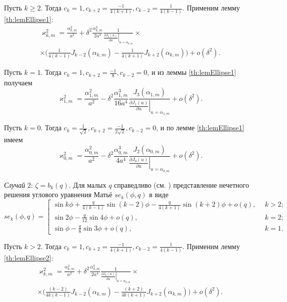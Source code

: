 Пусть $k \geq 2$. Тогда $c_k = 1, c_{k+2}=\frac{-1}{4(k+1)},  c_{k-2}=\frac{1}{4(k-1)}$. Применим лемму \ref{th:lemEllipse1}:
\begin{multline*}
\varkappa_{k, m}^2 = 
\frac{\alpha_{k, m}^2}{a^2} +  \delta^2 \frac{\alpha_{k, m}^3}{2 a^4}\frac{1}{\left.\frac{\partial J_{k} (u)}{\partial u}\right|_{u=\alpha_{k, m}}} \times \\ \times
\biggl(
\frac{1}{4(k-1)} J_{k-2}(\alpha_{k, m}) - \frac{1}{4(k+1)}J_{k+2}(\alpha_{k, m})
\biggr) + o(\delta^2).
\end{multline*}

Пусть $k =1$. Тогда $c_k = 1, c_{k+2}=\frac{-1}{8},  c_{k-2}=0$, и из леммы \ref{th:lemEllipse1} получаем
$$
\varkappa_{1, m}^2 = 
\frac{\alpha_{1, m}^2}{a^2} -  \delta^2 \frac{\alpha_{1, m}^3}{16 a^4}\frac{J_{3}(\alpha_{1, m})}{\left.\frac{\partial J_{1} (u)}{\partial u}\right|_{u=\alpha_{1, m}}}  + o(\delta^2).
$$

Пусть $k =0$. Тогда $c_k = \frac{1}{\sqrt{2}}, c_{k+2}=\frac{-1}{2\sqrt{2}},  c_{k-2}=0$, и по лемме \ref{th:lemEllipse1} имеем
$$
\varkappa_{0, m}^2 = 
\frac{\alpha_{0, m}^2}{a^2} -  \delta^2 \frac{\alpha_{0, m}^3}{4 a^4}\frac{J_{2}(\alpha_{0, m})}{\left.\frac{\partial J_{0} (u)}{\partial u}\right|_{u=\alpha_{0, m}}} 
 + o(\delta^2).
$$

\textit{Случай} 2: $\zeta = b_k(q)$.
Для малых $q$ справедливо (см. \cite{wref2}) представление нечетного решения углового уравнения Матьё $se_k(\phi, q)$ в виде 
{
\[
se_k(\phi, q) = 
\left[
\begin{array}{ll}
	\sin{k\phi} + 
	\frac{q}{4(k-1)} \sin{(k-2)\phi} - 
	\frac{q}{4(k+1)} \sin{(k+2)\phi} + o(q), \ \ & k > 2;\\
	\sin{2\phi} - \frac{q}{12} \sin{4 \phi} + o(q), & k = 2; \\
	\sin{\phi} - \frac{q}{8}\sin{3 \phi} + o(q), & k = 1. 
\end{array}
\right.
\]
}

Пусть $k > 2$. Тогда $c_k = 1, c_{k+2}=\frac{-1}{4(k+1)},  c_{k-2}=\frac{1}{4(k-1)}$. Применим лемму \ref{th:lemEllipse2}:
\begin{multline*}
\varkappa_{k, m}^2 = 
\frac{\alpha_{k, m}^2}{a^2} +  \delta^2 \frac{\alpha_{k, m}^3}{2 a^4}\frac{1}{\left.\frac{\partial J_{k} (u)}{\partial u}\right|_{u=\alpha_{k, m}}} \times \\ \times
\biggl(
\frac{(k-2)}{4k(k-1) } J_{k-2}(\alpha_{k, m}) - \frac{(k+2)}{4k(k+1) } J_{k+2}(\alpha_{k, m})
\biggr) + o(\delta^2).
\end{multline*}

